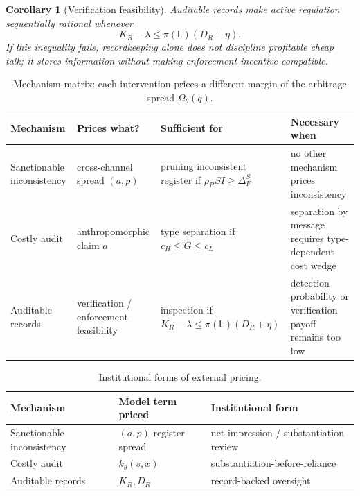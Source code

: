 \documentclass[preprint,authoryear]{elsarticle}
\newtheorem{corollary}{Corollary}
\theoremstyle{definition}
\theoremstyle{plain}
\begin{document}
\begin{corollary}[Verification feasibility]
\label{cor:verification-feasibility}
Auditable records make active regulation sequentially rational whenever
\[
K_R-\lambda \le \pi(\mathsf{L})(D_R+\eta).
\]
If this inequality fails, recordkeeping alone does not discipline profitable
cheap talk; it stores information without making enforcement
incentive-compatible.
\end{corollary}

\begin{table}[t]
\centering
\footnotesize
\setlength{\tabcolsep}{3pt}
\renewcommand{\arraystretch}{1.3}
\begin{tabular}{@{}p{2.6cm}p{2.6cm}p{2.9cm}p{2.9cm}@{}}
\toprule
\textbf{Mechanism} & \textbf{Prices what?} & \textbf{Sufficient for} & \textbf{Necessary when} \\
\midrule
Sanctionable inconsistency & cross-channel spread $(a,p)$ & pruning inconsistent register if $\rho_R SI\ge\Delta_F^S$ & no other mechanism prices inconsistency \\
Costly audit & anthropomorphic claim $a$ & type separation if $c_H\le G\le c_L$ & separation by message requires type-dependent cost wedge \\
Auditable records & verification / enforcement feasibility & inspection if $K_R{-}\lambda\le\pi(\mathsf{L})(D_R{+}\eta)$ & detection probability or verification payoff remains too low \\
\bottomrule
\end{tabular}
\caption{Mechanism matrix: each intervention prices a different margin of the
arbitrage spread $\Omega_\theta(q)$.}
\label{tab:mechanism-matrix}
\end{table}

\begin{table}[t]
\centering
\footnotesize
\setlength{\tabcolsep}{3pt}
\renewcommand{\arraystretch}{1.2}
\begin{tabular}{@{}p{3.0cm}p{3.0cm}p{4.3cm}@{}}
\toprule
Mechanism & Model term priced & Institutional form \\
\midrule
Sanctionable inconsistency & $(a,p)$ register spread & net-impression / substantiation review \\
Costly audit & $k_\theta(s,x)$ & substantiation-before-reliance \\
Auditable records & $K_R, D_R$ & record-backed oversight \\
\bottomrule
\end{tabular}
\caption{Institutional forms of external pricing.}
\label{tab:institutional-pricing}
\end{table}
\end{document}
